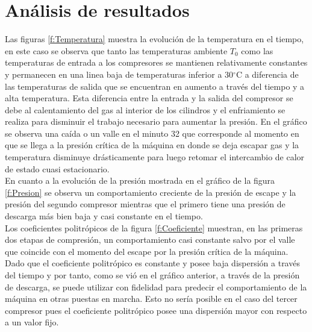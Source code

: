 \documentclass[11pt,letterpaper]{extarticle}        %
\numberwithin{equation}{section}                    %
\newcommand{\grados}{^{\circ}}                      %
\begin{document}
\section{Análisis de resultados}

Las figuras \ref{f:Temperatura} muestra la evolución de la temperatura en el tiempo, en este caso se observa que tanto las temperaturas ambiente $T_0$ como las temperaturas de entrada a los compresores se mantienen relativamente constantes y permanecen en una linea baja de temperaturas inferior a 30$\grados$C a diferencia de las temperaturas de salida que se encuentran en aumento a través del tiempo y a alta temperatura. Esta diferencia entre la entrada y la salida del compresor se debe al calentamiento del gas al interior de los cilindros y el enfriamiento se realiza para disminuir el trabajo necesario para aumentar la presión. En el gráfico se observa una caída o un valle en el minuto 32 que corresponde al momento en que se llega a la presión crítica de la máquina en donde se deja escapar gas y la temperatura disminuye drásticamente para luego retomar el intercambio de calor de estado cuasi estacionario.\\

En cuanto a la evolución de la presión mostrada en el gráfico de la figura \ref{f:Presion} se observa un comportamiento creciente de la presión de escape y la presión del segundo compresor mientras que el primero tiene una presión de descarga más bien baja y casi constante en el tiempo.\\

Los coeficientes politrópicos de la figura \ref{f:Coeficiente} muestran, en las primeras dos etapas de compresión, un comportamiento casi constante salvo por el valle que coincide con el momento del escape por la presión crítica de la máquina. Dado que el coeficiente politrópico es constante y posee baja dispersión a través del tiempo y por tanto, como se vió en el gráfico anterior, a través de la presión de descarga, se puede utilizar con fidelidad para predecir el comportamiento de la máquina en otras puestas en marcha. Esto no sería posible en el caso del tercer compresor pues el coeficiente politrópico posee una dispersión mayor con respecto a un valor fijo.\\
\end{document}
